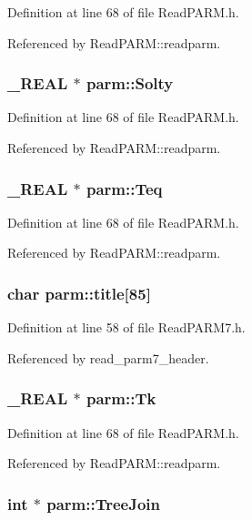 Definition at line 68 of file Read\-PARM.h.

Referenced by Read\-PARM::readparm.
\subsubsection{\setlength{\rightskip}{0pt plus 5cm}\_\-REAL $\ast$ parm::Solty}\label{structparm_m45}




Definition at line 68 of file Read\-PARM.h.

Referenced by Read\-PARM::readparm.
\subsubsection{\setlength{\rightskip}{0pt plus 5cm}\_\-REAL $\ast$ parm::Teq}\label{structparm_m41}




Definition at line 68 of file Read\-PARM.h.

Referenced by Read\-PARM::readparm.
\subsubsection{\setlength{\rightskip}{0pt plus 5cm}char parm::title[85]}\label{structparm_m87}




Definition at line 58 of file Read\-PARM7.h.

Referenced by read\_\-parm7\_\-header.
\subsubsection{\setlength{\rightskip}{0pt plus 5cm}\_\-REAL $\ast$ parm::Tk}\label{structparm_m40}




Definition at line 68 of file Read\-PARM.h.

Referenced by Read\-PARM::readparm.
\subsubsection{\setlength{\rightskip}{0pt plus 5cm}int $\ast$ parm::Tree\-Join}\label{structparm_m60}




